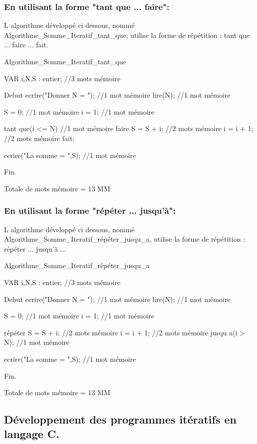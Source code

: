 \documentclass[•]{article}
\begin{document}
\subsubsection{En utilisant la forme "tant que ... faire":}
\textrm{L algorithme développé ci dessous, nommé Algorithme\_Somme\_Iteratif\_tant\_que, utilise la forme de répétition : tant que ... faire ... fait.}
\begin{sql}

 Algorithme_Somme_Iteratif_tant_que
 
 VAR
 i,N,S : entier;				//3 mots mémoire
 
 Debut
	ecrire("Donner N = ");		//1 mot mémoire
	lire(N);					//1 mot mémoire
	
	S = 0;						//1 mot mémoire
	i = 1;						//1 mot mémoire
	
	tant que(i <= N)			//1 mot mémoire
	  faire
		S = S + i;				//2 mots mémoire
		i = i + 1;				//2 mots mémoire
	  fait;
	  
	ecrire("La somme = ",S);	//1 mot mémoire
	
 Fin.
\end{sql}
\textrm{Totale de mots mémoire = 13 MM}

\subsubsection{En utilisant la forme "répéter ... jusqu'à":}
\textrm{L algorithme développé ci dessous, nommé Algorithme\_Somme\_Iteratif\_répéter\_jusqu\_a, utilise la forme de répétition : répéter ... jusqu'à ...}
\begin{sql}

 Algorithme_Somme_Iteratif_répéter_jusqu_a
 
 VAR
 i,N,S : entier;				//3 mots mémoire
 
 Debut
	ecrire("Donner N = ");		//1 mot mémoire
	lire(N);					//1 mot mémoire
	
	S = 0;						//1 mot mémoire
	i = 1;						//1 mot mémoire
	
	répéter
		S = S + i;				//2 mots mémoire
		i = i + 1;				//2 mots mémoire
	  jusqu a(i > N);			//1 mot mémoire
	  
	ecrire("La somme = ",S);	//1 mot mémoire
	
 Fin.
\end{sql}
\textrm{Totale de mots mémoire = 13 MM}

\subsection{Développement des programmes itératifs en langage C.}
\end{document}
